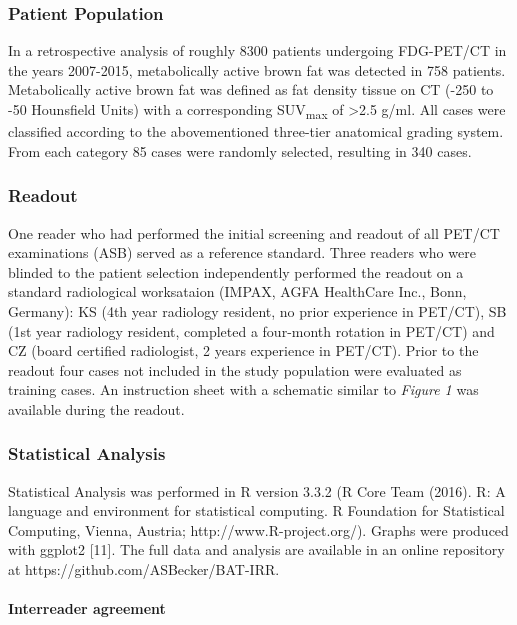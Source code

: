 \documentclass[]{elsarticle} %
\begin{document}
\subsubsection{Patient Population}\label{patient-population}

In a retrospective analysis of roughly 8300 patients undergoing
FDG-PET/CT in the years 2007-2015, metabolically active brown fat was
detected in 758 patients. Metabolically active brown fat was defined as
fat density tissue on CT (-250 to -50 Hounsfield Units) with a
corresponding SUV\textsubscript{max} of \textgreater{}2.5 g/ml. All
cases were classified according to the abovementioned three-tier
anatomical grading system. From each category 85 cases were randomly
selected, resulting in 340 cases.

\subsubsection{Readout}\label{readout}

One reader who had performed the initial screening and readout of all
PET/CT examinations (ASB) served as a reference standard. Three readers
who were blinded to the patient selection independently performed the
readout on a standard radiological worksataion (IMPAX, AGFA HealthCare
Inc., Bonn, Germany): KS (4th year radiology resident, no prior
experience in PET/CT), SB (1st year radiology resident, completed a
four-month rotation in PET/CT) and CZ (board certified radiologist, 2
years experience in PET/CT). Prior to the readout four cases not
included in the study population were evaluated as training cases. An
instruction sheet with a schematic similar to \emph{Figure 1} was
available during the readout.

\subsubsection{Statistical Analysis}\label{statistical-analysis}

Statistical Analysis was performed in R version 3.3.2 (R Core Team
(2016). R: A language and environment for statistical computing. R
Foundation for Statistical Computing, Vienna, Austria;
http://www.R-project.org/). Graphs were produced with ggplot2 {[}11{]}.
The full data and analysis are available in an online repository at
https://github.com/ASBecker/BAT-IRR.

\paragraph{Interreader agreement}\label{interreader-agreement}
\end{document}
